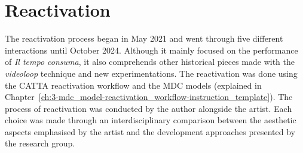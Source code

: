 \section{Reactivation}
The reactivation process began in May 2021 and went through five different interactions until October 2024. Although it mainly focused on the performance of \textit{Il tempo consuma}, it also comprehends other historical pieces made with the \textit{videoloop} technique and new experimentations. The reactivation was done using the CATTA reactivation workflow and the MDC models (explained in Chapter~\ref{ch:3-mdc_model-reactivation_workflow-instruction_template}). The process of reactivation was conducted by the author alongside the artist. Each choice was made through an interdisciplinary comparison between the aesthetic aspects emphasised by the artist and the development approaches presented by the research group.

